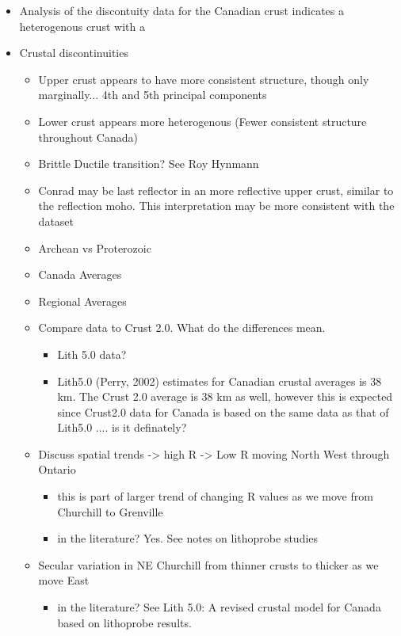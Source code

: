 \documentclass[draft, 12pt]{article}
\begin{document}
\begin{itemize}

\item Analysis of the discontuity data for the Canadian crust indicates a heterogenous crust with a
\item Crustal discontinuities
  \begin{itemize}

    \item Upper crust appears to have more consistent structure, though only marginally... 4th and 5th principal components
    \item Lower crust appears more heterogenous (Fewer consistent structure throughout Canada)
    \item Brittle Ductile transition? See Roy Hynmann
    \item Conrad may be last reflector in an more reflective upper crust, similar to the reflection moho. This interpretation may be more consistent with the dataset

  \end{itemize}



  \begin{itemize}
    \item Archean vs Proterozoic
    \item Canada Averages
    \item Regional Averages
    \item Compare data to Crust 2.0. What do the differences mean.
      \begin{itemize}
      \item Lith 5.0 data?
      \item Lith5.0 (Perry, 2002) estimates for Canadian crustal averages is 38 km. The Crust
        2.0 average is 38 km as well, however this is expected since Crust2.0 data for
        Canada is based on the same data as that of Lith5.0 .... is it definately?

      \end{itemize}

    \item Discuss spatial trends -> high R -> Low R moving North West through Ontario
      \begin{itemize}
      \item this is part of larger trend of changing R values as we move from Churchill to Grenville
      \item in the literature? Yes. See notes on lithoprobe studies
      \end{itemize}

    \item Secular variation in NE Churchill from thinner crusts to thicker as we move East
      \begin{itemize}
      \item in the literature? See Lith 5.0: A revised crustal model for Canada based on lithoprobe results.
      \end{itemize}
  \end{itemize}


\end{itemize}
\end{document}

